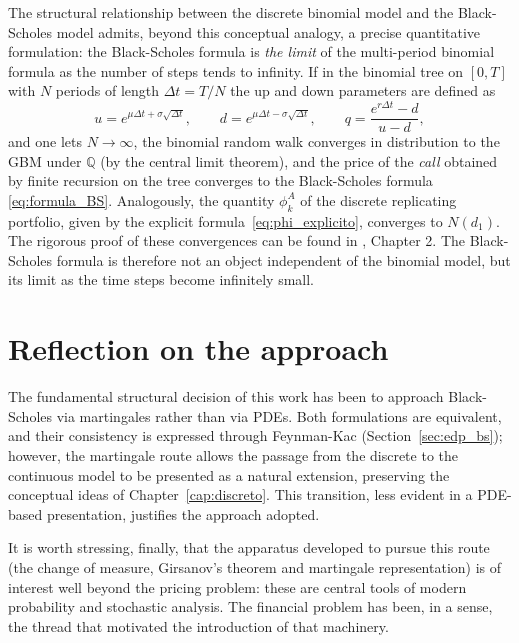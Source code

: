 \documentclass[11pt,a4paper,oneside]{report}
\theoremstyle{plain}
\theoremstyle{definition}
\theoremstyle{remark}
\newcommand{\Q}{\mathbb{Q}}
\newcommand{\1}{\mathbf{1}}
\begin{document}
The structural relationship between the discrete binomial model and
the Black-Scholes model admits, beyond this conceptual analogy, a
precise quantitative formulation: the Black-Scholes formula is
\emph{the limit} of the multi-period binomial formula as the number of
steps tends to infinity. If in the binomial tree on $[0, T]$ with $N$
periods of length $\Delta t = T/N$ the up and down parameters are
defined as
\begin{equation*}
  u = e^{\mu\Delta t+\sigma\sqrt{\Delta t}}, \qquad
  d = e^{\mu\Delta t-\sigma\sqrt{\Delta t}}, \qquad
  q = \frac{e^{r \Delta t} - d}{u - d},
\end{equation*}
and one lets $N \to \infty$, the binomial random walk converges in
distribution to the GBM under $\Q$ (by the central limit theorem),
and the price of the \emph{call} obtained by finite recursion on the
tree converges to the Black-Scholes formula \eqref{eq:formula_BS}.
Analogously, the quantity $\phi_k^A$ of the discrete replicating
portfolio, given by the explicit formula~\eqref{eq:phi_explicito},
converges to $N(d_1)$. The rigorous proof of these convergences can
be found in \cite{etheridge}, Chapter 2. The Black-Scholes formula is
therefore not an object independent of the binomial model, but its
limit as the time steps become infinitely small.

\section{Reflection on the approach}
\label{sec:reflexion_enfoque}

The fundamental structural decision of this work has been to approach
Black-Scholes via martingales rather than via PDEs. Both formulations
are equivalent, and their consistency is expressed through
Feynman-Kac (Section~\ref{sec:edp_bs}); however, the martingale route
allows the passage from the discrete to the continuous model to be
presented as a natural extension, preserving the conceptual ideas of
Chapter~\ref{cap:discreto}. This transition, less evident in a
PDE-based presentation, justifies the approach adopted.


It is worth stressing, finally, that the apparatus developed to
pursue this route (the change of measure, Girsanov's theorem and
martingale representation) is of interest well beyond the pricing
problem: these are central tools of modern probability and
stochastic analysis. The financial problem has been, in a sense, the
thread that motivated the introduction of that machinery.
\end{document}
